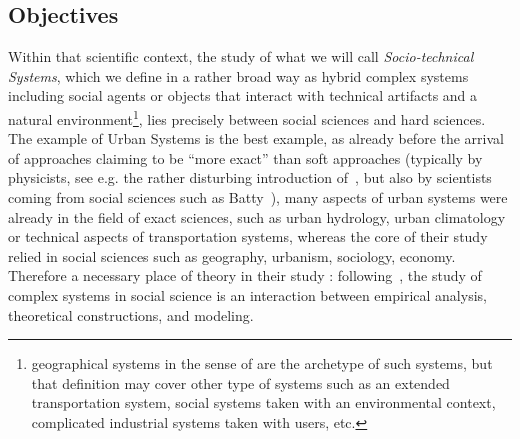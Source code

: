 \subsection*{Objectives}

Within that scientific context, the study of what we will call \emph{Socio-technical Systems}, which we define in a rather broad way as hybrid complex systems including social agents or objects that interact with technical artifacts and a natural environment\footnote{geographical systems in the sense of \cite{dollfus1975some} are the archetype of such systems, but that definition may cover other type of systems such as an extended transportation system, social systems taken with an environmental context, complicated industrial systems taken with users, etc.}, lies precisely between social sciences and hard sciences. The example of Urban Systems is the best example, as already before the arrival of approaches claiming to be ``more exact'' than soft approaches (typically by physicists, see e.g. the rather disturbing introduction of~\cite{louf2014scaling}, but also by scientists coming from social sciences such as Batty~\cite{batty2013new}), many aspects of urban systems were already in the field of exact sciences, such as urban hydrology, urban climatology or technical aspects of transportation systems, whereas the core of their study relied in social sciences such as geography, urbanism, sociology, economy. Therefore a necessary place of theory in their study : following~\cite{livet2010}, the study of complex systems in social science is an interaction between empirical analysis, theoretical constructions, and modeling.

